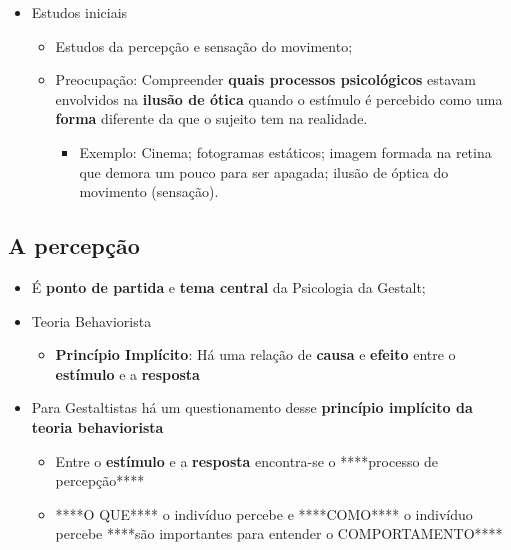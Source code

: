 \documentclass[
]{book}
\providecommand{\tightlist}{%
  \setlength{\itemsep}{0pt}\setlength{\parskip}{0pt}}
\begin{document}
\begin{itemize}
\tightlist
\item
  Estudos iniciais

  \begin{itemize}
  \tightlist
  \item
    Estudos da percepção e sensação do movimento;
  \item
    Preocupação: Compreender \textbf{quais processos psicológicos} estavam envolvidos na \textbf{ilusão de ótica} quando o estímulo é percebido como uma \textbf{forma} diferente da que o sujeito tem na realidade.

    \begin{itemize}
    \tightlist
    \item
      Exemplo: Cinema; fotogramas estáticos; imagem formada na retina que demora um pouco para ser apagada; ilusão de óptica do movimento (sensação).
    \end{itemize}
  \end{itemize}
\end{itemize}

\hypertarget{a-percepuxe7uxe3o}{%
\subsection{A percepção}\label{a-percepuxe7uxe3o}}

\begin{itemize}
\tightlist
\item
  É \textbf{ponto de partida} e \textbf{tema central} da Psicologia da Gestalt;
\item
  Teoria Behaviorista

  \begin{itemize}
  \tightlist
  \item
    \textbf{Princípio Implícito}: Há uma relação de \textbf{causa} e \textbf{efeito} entre o \textbf{estímulo} e a \textbf{resposta}
  \end{itemize}
\item
  Para Gestaltistas há um questionamento desse \textbf{princípio implícito da teoria behaviorista}

  \begin{itemize}
  \tightlist
  \item
    Entre o \textbf{estímulo} e a \textbf{resposta} encontra-se o ****processo de percepção****
  \item
    ****O QUE**** o indivíduo percebe e ****COMO**** o indivíduo percebe ****são importantes para entender o COMPORTAMENTO****
  \end{itemize}
\end{itemize}
\end{document}

